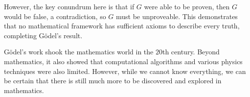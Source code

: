 \documentclass{article}
\begin{document}
However, the key conundrum here is that if $G$ were able to be proven, then $G$ would be false, a contradiction, so $G$ must be unproveable. This demonstrates that no mathematical framework has sufficient axioms to describe every truth, completing Gödel's result. 

Gödel's work shook the mathematics world in the $20$th century. Beyond mathematics, it also showed that computational algorithms and various physics techniques were also limited. However, while we cannot know everything, we can be certain that there is still much more to be discovered and explored in mathematics.
\end{document}
